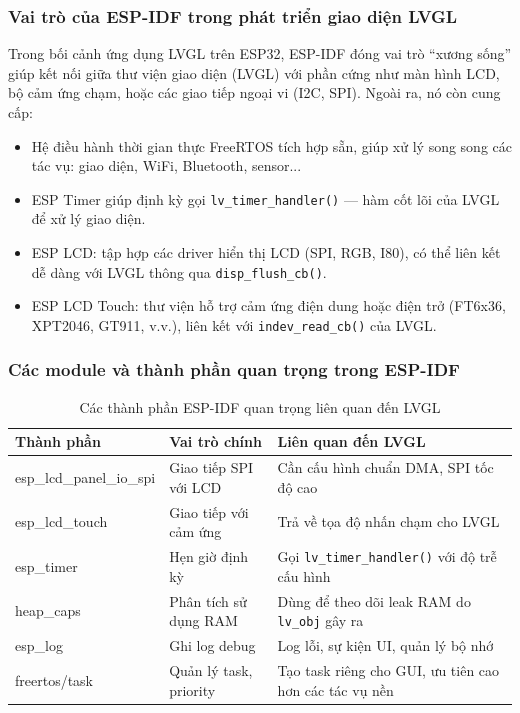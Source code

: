 \subsubsection{Vai trò của ESP-IDF trong phát triển giao diện LVGL}
Trong bối cảnh ứng dụng LVGL trên ESP32, ESP-IDF đóng vai trò ``xương sống'' giúp kết nối giữa thư viện giao diện (LVGL) với phần cứng như màn hình LCD, bộ cảm ứng chạm, hoặc các giao tiếp ngoại vi (I2C, SPI). Ngoài ra, nó còn cung cấp:
\begin{itemize}
    \item Hệ điều hành thời gian thực FreeRTOS tích hợp sẵn, giúp xử lý song song các tác vụ: giao diện, WiFi, Bluetooth, sensor...
    \item ESP Timer giúp định kỳ gọi \texttt{lv\_timer\_handler()} --- hàm cốt lõi của LVGL để xử lý giao diện.
    \item ESP LCD: tập hợp các driver hiển thị LCD (SPI, RGB, I80), có thể liên kết dễ dàng với LVGL thông qua \texttt{disp\_flush\_cb()}.
    \item ESP LCD Touch: thư viện hỗ trợ cảm ứng điện dung hoặc điện trở (FT6x36, XPT2046, GT911, v.v.), liên kết với \texttt{indev\_read\_cb()} của LVGL.
\end{itemize}
\subsubsection{Các module và thành phần quan trọng trong ESP-IDF}
\begin{table}[H]
  \centering
  \begin{tabularx}{\textwidth}{|l|l|X|}
  \hline
  \textbf{Thành phần} & \textbf{Vai trò chính} & \textbf{Liên quan đến LVGL} \\
  \hline
  esp\_lcd\_panel\_io\_spi & Giao tiếp SPI với LCD & Cần cấu hình chuẩn DMA, SPI tốc độ cao \\
  esp\_lcd\_touch & Giao tiếp với cảm ứng & Trả về tọa độ nhấn chạm cho LVGL \\
  esp\_timer & Hẹn giờ định kỳ & Gọi \texttt{lv\_timer\_handler()} với độ trễ cấu hình \\
  heap\_caps & Phân tích sử dụng RAM & Dùng để theo dõi leak RAM do \texttt{lv\_obj} gây ra \\
  esp\_log & Ghi log debug & Log lỗi, sự kiện UI, quản lý bộ nhớ \\
  freertos/task & Quản lý task, priority & Tạo task riêng cho GUI, ưu tiên cao hơn các tác vụ nền \\
  \hline
  \end{tabularx}
  \caption{Các thành phần ESP-IDF quan trọng liên quan đến LVGL}
  \end{table}
  
